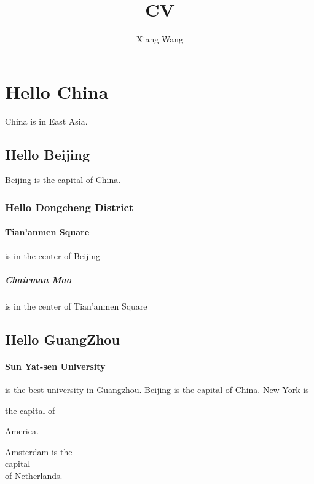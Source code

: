\documentclass{article}
\author{Xiang Wang}
\title{CV}
\begin{document}
	\maketitle
	\section{Hello China} China is in East Asia.
		\subsection{Hello Beijing} Beijing is 
		the capital of China.
			\subsubsection{Hello Dongcheng District}
				\paragraph{Tian'anmen Square}is in the center of Beijing
					\subparagraph{Chairman Mao} is in the center of Tian'anmen Square
		\subsection{Hello GuangZhou}
			\paragraph{Sun Yat-sen University} is the best university in Guangzhou.
	Beijing is the
	capital of China.
	New York is
	
	the capital of 
	
	America.
	
	Amsterdam is the \\ capital \\ of 	Netherlands.
\end{document}
